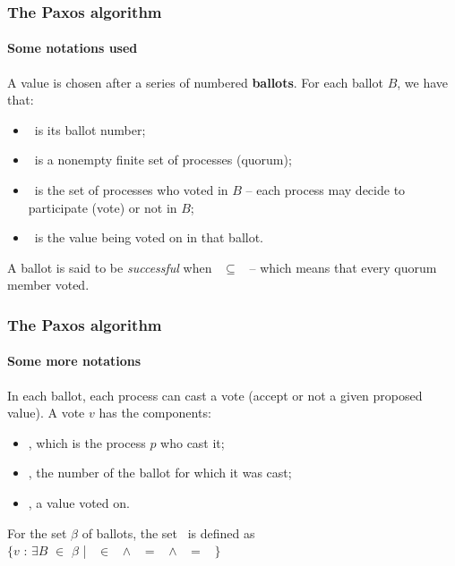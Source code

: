 \documentclass[10 pt]{beamer}
\begin{document}
\begin{frame}
  \frametitle{The Paxos algorithm}
  \framesubtitle{Some notations used}
  
  A value is chosen after a series of numbered \textbf{ballots}. For each ballot $B$, we have that:
  \begin{itemize}
    \item \bbal\ is its ballot number; %
    \item \bqrm\ is a nonempty finite set of processes (quorum);
    \item \bvot\ is the set of processes who voted in $B$ -- each process may decide to participate (vote) or not in $B$;
    \item \bval\ is the value being voted on in that ballot.
  \end{itemize}
  
  \vspace{4 mm}
  A ballot is said to be \emph{successful} when \bqrm\ $\subseteq$ \bvot\ -- which means that every quorum member voted.

\end{frame}

\begin{frame}
  \frametitle{The Paxos algorithm}
  \framesubtitle{Some more notations}
  
  In each ballot, each process can cast a vote (accept or not a given proposed value). A vote $v$ has the components:

  \begin{itemize}
    \item \vp, which is the process $p$ who cast it;
    \item \vbal, the number of the ballot for which it was cast;
    \item \vval, a value voted on.
  \end{itemize}
  
  \vspace{4 mm}
 For the set $\beta$ of ballots, the set \votesbeta\ is defined as\\
 $\{v$ : $\exists B$ $\in$ $\beta$ | \vp\ $\in$ \bvot\ $\wedge$ \vbal\ $=$ \bbal\ $\wedge$ \vval\ $=$ \bval\ $\}$ 

\end{frame}
\end{document}
